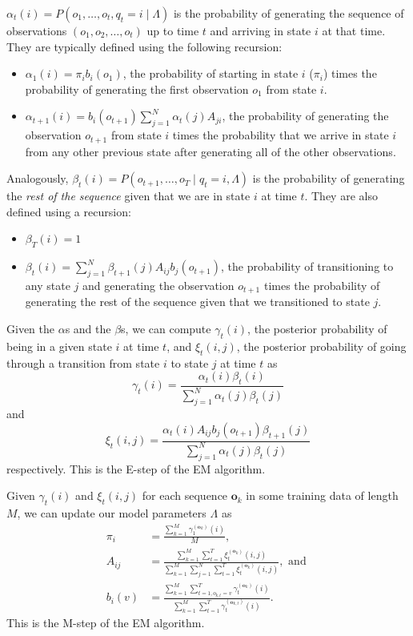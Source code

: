 $\alpha_t(i) = P(o_1, \ldots, o_t, q_t = i \mid \Lambda)$ is the probability of
generating the sequence of observations $(o_1, o_2, \ldots, o_t)$ up to time
$t$ and arriving in state $i$ at that time. They are typically defined
using the following recursion:
\begin{itemize}
  \item $\alpha_1(i) = \pi_i b_i(o_1)$, the probability of starting in
    state $i$ ($\pi_i$) times the probability of generating the first
    observation $o_1$ from state $i$.
  \item $\alpha_{t+1}(i) = b_i(o_{t+1})\sum_{j=1}^N \alpha_t(j) A_{ji}$,
    the probability of generating the observation $o_{t+1}$ from state $i$
    times the probability that we arrive in state $i$ from any other
    previous state after generating all of the other observations.
\end{itemize}

Analogously, $\beta_t(i) = P(o_{t+1}, \ldots, o_{T} \mid q_t = i, \Lambda)$
is the probability of generating the \emph{rest of the sequence} given that
we are in state $i$ at time $t$. They are also defined using a recursion:
\begin{itemize}
  \item $\beta_T(i) = 1$
  \item $\beta_t(i) = \sum_{j=1}^N \beta_{t+1}(j) A_{ij} b_j(o_{t+1})$, the
    probability of transitioning to any state $j$ and generating the
    observation $o_{t+1}$ times the probability of generating the rest of
    the sequence given that we transitioned to state $j$.
\end{itemize}

Given the $\alpha$s and the $\beta$s, we can compute $\gamma_t(i)$, the posterior
probability of being in a given state $i$ at time $t$, and $\xi_t(i,j)$,
the posterior probability of going through a transition from state $i$ to
state $j$ at time $t$ as
\begin{equation}
  \gamma_t(i) = \frac{\alpha_t(i)\beta_t(i)}{\sum_{j=1}^N
  \alpha_t(j)\beta_t(j)}
\end{equation}
and
\begin{equation}
  \xi_t(i,j) = \frac{\alpha_t(i) A_{ij} b_j(o_{t+1}) \beta_{t+1}(j)}
  {\sum_{j=1}^N \alpha_t(j)\beta_t(j)}
\end{equation}
respectively. This is the E-step of the EM algorithm.

Given $\gamma_t(i)$ and $\xi_t(i,j)$ for each sequence $\mathbf{o}_k$ in
some training data of length $M$, we can update our model parameters
$\Lambda$ as
\begin{align}
  \pi_i &= \frac{\sum_{k=1}^M \gamma^{(\mathbf{o}_k)}_1(i)}{M},\\
  A_{ij} &= \frac{\sum_{k=1}^M \sum_{t=1}^T \xi^{(\mathbf{o}_k)}_t(i,j)}
  {\sum_{k=1}^M \sum_{j=1}^N \sum_{t=1}^T \xi^{(\mathbf{o}_k)}_t(i,j)},
  \text{ and }\\
  b_i(v) &= \frac{\sum_{k=1}^M \sum_{t=1, o_{k,t} = v}^T
  \gamma^{(\mathbf{o}_k)}_t(i)}
  {\sum_{k=1}^M \sum_{t=1}^T \gamma^{(\mathbf{o}_{k,t})}_t(i)}.
\end{align}
This is the M-step of the EM algorithm.

